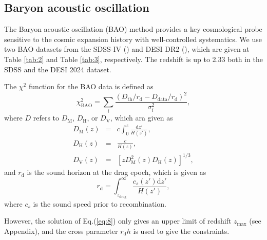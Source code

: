 \documentclass[twocolumn]{aastex631}
\begin{document}
\subsection{Baryon acoustic oscillation}

   The Baryon acoustic oscillation (BAO) method provides a key cosmological probe
   sensitive to the cosmic expansion history with well-controlled systematics.
   We use two BAO datasets from the SDSS-IV (\cite{PhysRevD.103.083533}) and 
   DESI DR2 (\cite{desicollaboration2025desidr2resultsii}),
   which are given at Table \ref{tab:2} and Table \ref{tab:3}, respectively.
   The redshift is up to 2.33 both in the SDSS and the DESI 2024 dataset.

   The $\chi^2$ function for the BAO data is defined as
   \begin{equation}
      \chi_{\text{BAO}}^2=\sum_i\frac{(D_{\text{th}}/r_{\text{d}}-D_{\text{data}}/r_{\text{d}})^2}{\sigma_i^2},
   \end{equation}
   where $D$ refers to $D_{\text{M}}$, $D_{\text{H}}$, or $D_{\text{V}}$, which ara given as
   \begin{eqnarray}
      D_{\text{M}}(z)&=&c\int_0^z\frac{\text{d}z'}{H(z')},\\
      D_{\text{H}}(z)&=&\frac{c}{H(z)},\\
      D_{\text{V}}(z)&=&\left[zD_{\text{M}}^2(z)D_{\text{H}}(z)\right]^{1/3},
   \end{eqnarray}
   and $r_{\text{d}}$ is the sound horizon at the drag epoch, which is given as
   \begin{equation}
      r_{\text{d}}=\int_{z_{\text{drag}}}^{\infty}\frac{c_s(z')\text{d}z'}{H(z')},
   \end{equation}
   where $c_s$ is the sound speed prior to recombination.

   However, the solution of Eq.(\ref{eq:8}) only gives an upper 
   limit of redshift $z_{\max}$ (see Appendix), and the cross 
   parameter $r_{\text{d}}h$ is used to give the constraints.
\end{document}
